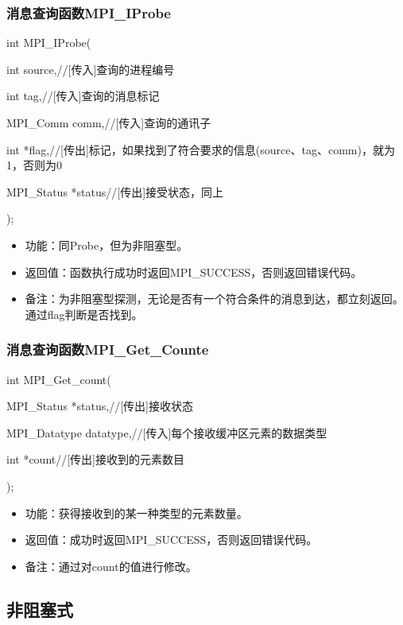 \documentclass[UTF8]{article}%
\begin{document}
\subsubsection{消息查询函数MPI\_IProbe}

int MPI\_IProbe(

    \qquad int         source,//[传入]查询的进程编号

    \qquad int         tag,//[传入]查询的消息标记

    \qquad MPI\_Comm   comm,//[传入]查询的通讯子

    \qquad int         *flag,//[传出]标记，如果找到了符合要求的信息(source、tag、comm)，就为1，否则为0

    \qquad MPI\_Status *status//[传出]接受状态，同上

);

\begin{itemize}
    \item 功能：同Probe，但为非阻塞型。
    \item 返回值：函数执行成功时返回MPI\_SUCCESS，否则返回错误代码。
    \item 备注：为非阻塞型探测，无论是否有一个符合条件的消息到达，都立刻返回。通过flag判断是否找到。
\end{itemize}

\subsubsection{消息查询函数MPI\_Get\_Counte}

int MPI\_Get\_count(

    \qquad MPI\_Status   *status,//[传出]接收状态

    \qquad MPI\_Datatype datatype,//[传入]每个接收缓冲区元素的数据类型

    \qquad int          *count//[传出]接收到的元素数目

);

\begin{itemize}
    \item 功能：获得接收到的某一种类型的元素数量。
    \item 返回值：成功时返回MPI\_SUCCESS，否则返回错误代码。
    \item 备注：通过对count的值进行修改。
\end{itemize}

\subsection{非阻塞式}
\end{document}
